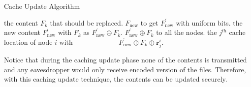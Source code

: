 \documentclass[10pt,journal]{IEEEtran}
\begin{document}
{\begin{algorithm}
    \caption{Cache Update Algorithm}
    \label{alg:1}
    \begin{algorithmic}[1]
         {the content $F_{k}$ that should be replaced}. 
         {$F_{\textrm{new}}$ to get $F_{\textrm{new}}^{'}$ with uniform bits.}
         the new content $F_{\textrm{new}}^{'}$ with $F_{k}$ as $F_{\textrm{new}}^{'} \oplus F_{k}$.
         $F_{\textrm{new}}^{'} \oplus F_{k}$ to all the nodes.
         the $j^{th}$ cache location of node $i$ with  
        \Statex~~~~~~~~~~~~ $F_{\textrm{new}}^{'} \oplus F_{k} \oplus \mathbf{r}^i_j$. 
        \EndIf
        \EndFor 
        \EndProcedure
	\Statex       
    \end{algorithmic}
\end{algorithm}

{ Notice that during the caching update phase none of the contents is transmitted and any eavesdropper would only receive encoded version of the files. Therefore, with this caching update technique, the contents can be updated securely.}


}
\end{document}
